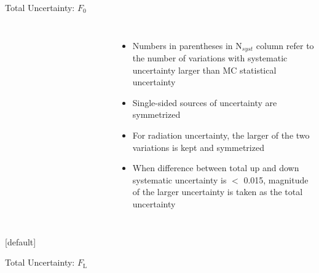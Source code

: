 \documentclass{beamer}
\newcommand*{\fo}{\ensuremath{F_{\text{0}}}\xspace}
\newcommand*{\fl}{\ensuremath{F_{\text{L}}}\xspace}
\begin{document}
{\begin{frame}{Total Uncertainty: \fo}
\begin{columns}
\begin{table}[h!]
\begin{tabular}{lcccc}
          \hline\hline
        \end{tabular}
        
      \end{table}
      \begin{itemize}\footnotesize
        \item Numbers in parentheses in N$_{syst}$ column refer to the number of variations with systematic uncertainty larger than MC statistical uncertainty
        \item Single-sided sources of uncertainty are symmetrized
        \item For radiation uncertainty, the larger of the two variations is kept and symmetrized
        \item  When difference between total up and down systematic uncertainty is $<$ 0.015, magnitude of the larger uncertainty is taken as the total uncertainty
      \end{itemize}
    \end{columns}
    
  \end{frame}


  \makeatletter %
  [default]
  \def\beamer@entrycode{\vspace*{-1.075\headheight}}
  \begin{frame}{Total Uncertainty: \fl}
    \begin{columns}
      \vspace{-14pt}
      \begin{table}[h!]\fontsize{5}{6}\selectfont
        \centering
        

\end{table}
\end{columns}
\end{frame}}
\end{document}
